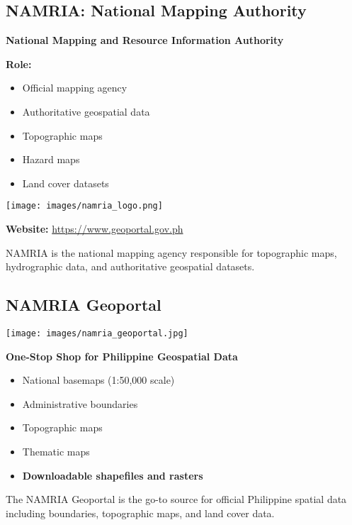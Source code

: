 \documentclass[
  letterpaper,
  DIV=11,
  numbers=noendperiod]{scrartcl}
\providecommand{\tightlist}{%
  \setlength{\itemsep}{0pt}\setlength{\parskip}{0pt}}
\begin{document}
\subsection{NAMRIA: National Mapping
Authority}\label{namria-national-mapping-authority}

\textbf{National Mapping and Resource Information Authority}

\textbf{Role:}

\begin{itemize}
\tightlist
\item
  Official mapping agency
\item
  Authoritative geospatial data
\item
  Topographic maps
\item
  Hazard maps
\item
  Land cover datasets
\end{itemize}

\texttt{[image: images/namria\_logo.png]}

\textbf{Website:} \url{https://www.geoportal.gov.ph}

NAMRIA is the national mapping agency responsible for topographic maps,
hydrographic data, and authoritative geospatial datasets.

\subsection{NAMRIA Geoportal}\label{namria-geoportal}

\begin{center}
\texttt{[image: images/namria\_geoportal.jpg]}
\end{center}

\textbf{One-Stop Shop for Philippine Geospatial Data}

\begin{itemize}
\tightlist
\item
  National basemaps (1:50,000 scale)
\item
  Administrative boundaries
\item
  Topographic maps
\item
  Thematic maps
\item
  \textbf{Downloadable shapefiles and rasters}
\end{itemize}

The NAMRIA Geoportal is the go-to source for official Philippine spatial
data including boundaries, topographic maps, and land cover data.
\end{document}

